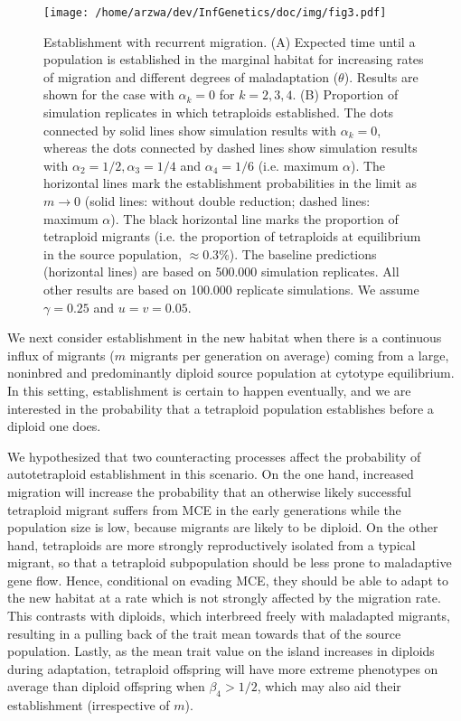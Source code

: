 \documentclass[12pt,a4paper]{article}
\begin{document}
\begin{figure}[t]
\centering
\texttt{[image: /home/arzwa/dev/InfGenetics/doc/img/fig3.pdf]}
\caption{
    Establishment with recurrent migration.
    (A) Expected time until a population is established in the marginal habitat
    for increasing rates of migration and different degrees of maladaptation
    ($\theta$). Results are shown for the case with $\alpha_k = 0$ for
    $k=2,3,4$. 
    (B) Proportion of simulation replicates in which tetraploids established.
    The dots connected by solid lines show simulation results with
    $\alpha_k=0$, whereas the dots connected by dashed lines
    show simulation results with $\alpha_2=1/2, \alpha_3=1/4$ and
    $\alpha_4=1/6$ (i.e. maximum $\alpha$).
    The horizontal lines mark the establishment probabilities in the
    limit as $m\rightarrow 0$ (solid lines: without double reduction; dashed
    lines: maximum $\alpha$).
    The black horizontal line marks the proportion of tetraploid migrants
    (i.e. the proportion of tetraploids at equilibrium in the source
    population, $\approx 0.3$\%).
    The baseline predictions (horizontal lines) are based on 500.000 simulation
    replicates.
    All other results are based on 100.000 replicate simulations.
    We assume $\gamma=0.25$ and $u=v=0.05$.
    \label{fig:estwmig}}
\end{figure}

We next consider establishment in the new habitat when there is a continuous
influx of migrants ($m$ migrants per generation on average) coming from a large,
noninbred and predominantly diploid source population at cytotype equilibrium.
In this setting, establishment is certain to happen eventually, and we are
interested in the probability that a tetraploid population establishes before a
diploid one does.

We hypothesized that two counteracting processes affect the probability of
autotetraploid establishment in this scenario.
On the one hand, increased migration will increase the probability that an
otherwise likely successful tetraploid migrant suffers from MCE in the early
generations while the population size is low, because migrants are likely to be
diploid.
On the other hand, tetraploids are more strongly reproductively isolated from
a typical migrant, so that a tetraploid subpopulation should be less prone to
maladaptive gene flow.
Hence, conditional on evading MCE, they should be able to adapt to the new
habitat at a rate which is not strongly affected by the migration rate.
This contrasts with diploids, which interbreed freely with maladapted
migrants, resulting in a pulling back of the trait mean towards that of the
source population.
Lastly, as the mean trait value on the island increases in diploids
during adaptation, tetraploid offspring will have more extreme phenotypes on
average than diploid offspring when $\beta_4 > 1/2$, which may also aid their
establishment (irrespective of $m$).
\end{document}
